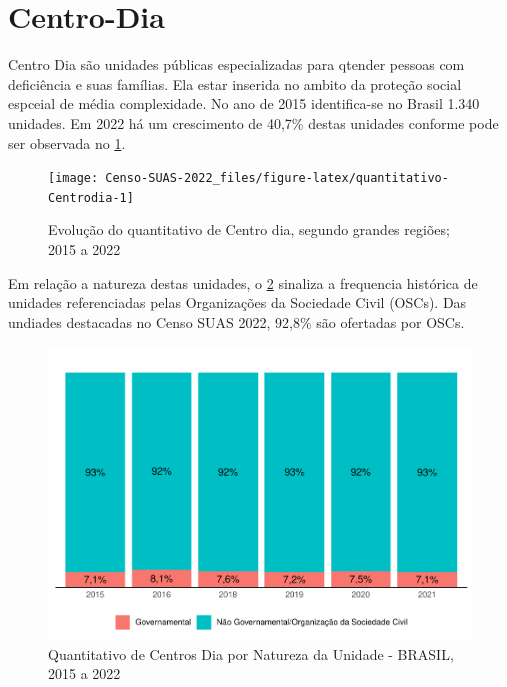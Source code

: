 \documentclass[
  brazilian]{report}
\begin{document}
\hypertarget{centro-dia}{%
\section{Centro-Dia}\label{centro-dia}}

Centro Dia são unidades públicas especializadas para qtender pessoas com
deficiência e suas famílias. Ela estar inserida no ambito da proteção
social espceial de média complexidade. No ano de 2015 identifica-se no
Brasil 1.340 unidades. Em 2022 há um crescimento de 40,7\% destas
unidades conforme pode ser observada no
\cref{fig:quantitativo-Centrodia}.

\begin{figure}
\texttt{[image: Censo-SUAS-2022\_files/figure-latex/quantitativo-Centrodia-1]} \caption[Evolução do quantitativo de Centro dia, segundo grandes regiões]{Evolução do quantitativo de Centro dia, segundo grandes regiões; 2015 a 2022}\label{fig:quantitativo-Centrodia}
\end{figure}

Em relação a natureza destas unidades, o \cref{fig:cdia-natureza}
sinaliza a frequencia histórica de unidades referenciadas pelas
Organizações da Sociedade Civil (OSCs). Das undiades destacadas no Censo
SUAS 2022, 92,8\% são ofertadas por OSCs.

\begin{figure}
\includegraphics{Censo-SUAS-2022_files/figure-latex/cdia-natureza-1} \caption[Quantitativo de Centros Dia por Natureza da Unidade - BRASIL, 2015 a 2022]{Quantitativo de Centros Dia por Natureza da Unidade - BRASIL, 2015 a 2022}\label{fig:cdia-natureza}
\end{figure}
\end{document}
